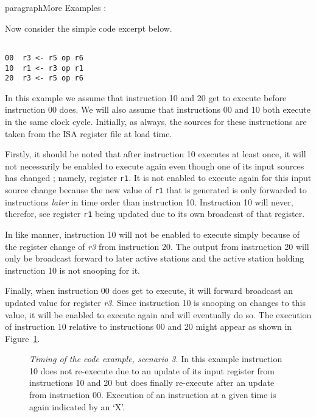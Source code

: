 paragraph{More Examples : }

Now consider the simple code excerpt below.

\begin{verbatim}

00	r3 <- r5 op r6
10	r1 <- r3 op r1
20	r3 <- r5 op r6

\end{verbatim}

In this example we assume that instruction 10 and 20 get to execute
before instruction 00 does.  We will also assume that instructions
00 and 10 both execute in the same clock cycle.
Initially, as always, the sources for these instructions
are taken from the ISA register file at load time.

Firstly, it should be noted that after instruction 10
executes at least once, it will not necessarily be enabled to execute
again even though one of its input sources has changed ; namely,
register
{\tt r1}.
It is not enabled to execute again for this input source change because
the new value of
{\tt r1}
that is generated is only forwarded to instructions {\it later}
in time order than instruction 10.  
Instruction 10 will never, therefor, see register
{\tt r1}
being updated due to its own broadcast of that register.

In like manner, instruction
10 will not be enabled to execute simply because of the register change
of
{\it r3}
from instruction 20.  The output from instruction 20 will
only be broadcast forward to later active stations and
the active station holding instruction 10 is not snooping for it.

Finally, when instruction 00 does get to execute, it will
forward broadcast an updated value for register
{\it r3}.
Since instruction 10 is snooping on changes to this value,
it will be enabled to execute again and will eventually do so.
The execution of instruction 10 relative to instructions
00 and 20 might appear as shown in
Figure~\ref{ex3}.

\begin{figure}
\centering
{}
\caption{{\em Timing of the code example, scenario 3.}
In this example instruction 10 does not re-execute due to an update
of its input register from instructions 10 and 20 but does
finally re-execute after an update from instruction 00.
Execution of an instruction at a given time is
again indicated by an `X'.}
\label{ex3}
\end{figure}




